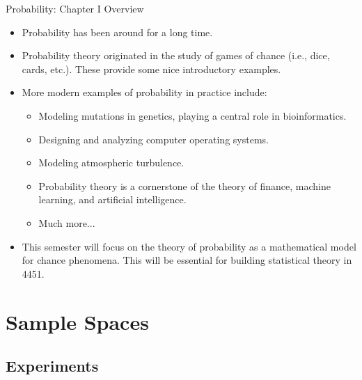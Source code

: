 \begin{frame}[allowframebreaks]{Probability: Chapter I Overview}

\begin{itemize}

\item Probability has been around for a long time.
\item Probability theory originated in the study of games of chance (i.e., dice, cards, etc.). These provide some nice introductory examples. 
\item More modern examples of probability in practice include: 
\begin{itemize}
  \item Modeling mutations in genetics, playing a central role in bioinformatics.
  \item Designing and analyzing computer operating systems.
  \item Modeling atmospheric turbulence. 
  \item Probability theory is a cornerstone of the theory of finance, machine learning, and artificial intelligence.
  \item Much more...
\end{itemize}

\framebreak

\item This semester will focus on the theory of probability as a mathematical model for chance phenomena. This will be essential for building statistical theory in 4451.

\end{itemize}


\end{frame}

\section{Sample Spaces}

\subsection{Experiments}

